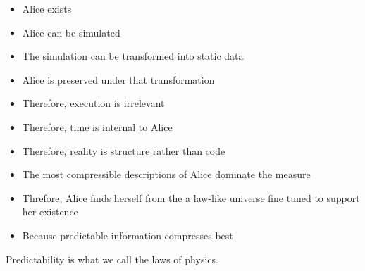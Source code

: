 \begin{itemize}
  \item Alice exists
  \item Alice can be simulated
  \item The simulation can be transformed into static data
  \item Alice is preserved under that transformation
  \item Therefore, execution is irrelevant
  \item Therefore, time is internal to Alice
  \item Therefore, reality is structure rather than code
  \item The most compressible descriptions of Alice dominate the measure
  \item Threfore, Alice finds herself from the a law-like universe fine tuned to support her existence
  \item Because predictable information compresses best
\end{itemize}

Predictability is what we call the laws of physics.


